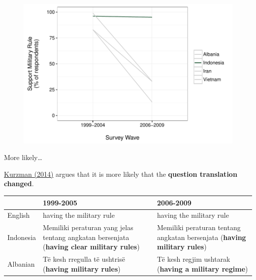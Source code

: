 \documentclass[10pt]{beamer}
\begin{document}
\begin{frame}

    \begin{figure}
        \includegraphics[scale=0.5]{img/wvs_indonesia.pdf}
    \end{figure}

\end{frame}

\begin{frame}{More likely\ldots}

    \href{https://www.washingtonpost.com/news/monkey-cage/wp/2014/09/02/world-values-lost-in-translation/}{Kurzman (2014)} argues that it is more likely that the \textbf{question translation changed}.
{\small{
    \begin{table}
        \begin{tabular}{l p{3.5cm} p{3.5cm}}
        \hline
        & 1999-2005 & 2006-2009\\
        \hline\hline
        English & having the military rule & having the military rule \\

        Indonesia & Memiliki peraturan yang jelas tentang angkatan bersenjata (\textbf{having clear military rules}) & Memiliki peraturan tentang angkatan bersenjata (\textbf{having military rules})\\

        Albanian & T\"{e} kesh rregulla t\"{e} ushtris\"{e} (\textbf{having military rules}) & T\"{e} kesh regjim ushtarak (\textbf{having a military regime}) \\

        \hline
        \end{tabular}
    \end{table}

}}

\end{frame}
\end{document}

